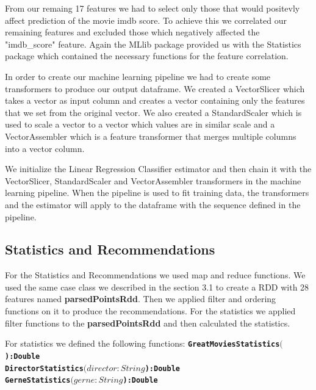 \documentclass[letterpaper,twocolumn,10pt]{article}
\begin{document}
From our remaing 17 features we had to select only those that would positevly affect prediction of the movie imdb score. To achieve this we correlated our remaining features and excluded those which negatively affected the "imdb\_score" feature. Again the MLlib package provided us with the Statistics package which contained the necessary functions for the feature correlation.\par 

In order to create our machine learning pipeline we had to create some transformers to produce our output dataframe. We created a VectorSlicer which takes a vector as input column and creates a vector containing only the features that we set from the original vector. We also created a StandardScaler which is used to scale a vector to a vector which values are in similar scale and a VectorAssembler which is a feature transformer that merges multiple columns into a vector column.\par 

We initialize the Linear Regression Classifier estimator and then chain it with the VectorSlicer, StandardScaler and VectorAssembler transformers in the machine learning pipeline. When the pipeline is used to fit training data, the transformers and the estimator will apply to the dataframe with the sequence defined in the pipeline.\par 

\subsection{Statistics and Recommendations}

For the Statistics and Recommendations we used map and reduce functions. We used the same case class we described in the section 3.1 to create a RDD with 28 features named \textbf{parsedPointsRdd}. Then we applied filter and ordering functions on it to produce the recommendations. For the statistics we applied filter functions to the \textbf{parsedPointsRdd} and then calculated the statistics. \par 

For statistics we defined the following functions:
\noindent
{\bf \tt GreatMoviesStatistics\((\)):Double } \\ 

\noindent
{\bf \tt DirectorStatistics\((director:String\)):Double } \\ 

\noindent
{\bf \tt GerneStatistics\((gerne:String\)):Double } \\ 
\end{document}
